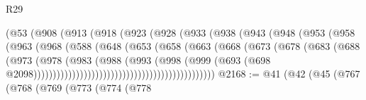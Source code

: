 \begin{lexlean}{R29}
\begin{coremodule}
                                (@53
                                  (@908
                                    (@913
                                      (@918
                                        (@923
                                          (@928
                                            (@933
                                              (@938
                                                (@943
                                                  (@948
                                                    (@953
                                                      (@958
                                                        (@963
                                                          (@968
                                                            (@588
                                                              (@648
                                                                (@653
                                                                  (@658
                                                                    (@663
                                                                      (@668
                                                                        (@673
                                                                          (@678
                                                                            (@683
                                                                              (@688
                                                                                (@973
                                                                                  (@978
                                                                                    (@983
                                                                                      (@988
                                                                                        (@993
                                                                                          (@998
                                                                                            (@999
                                                                                              (@693
                                                                                                (@698
                                                                                                  @2098)))))))))))))))))))))))))))))))))))))))))))))))
@2168 := @41
    (@42
      (@45
        (@767
          (@768
            (@769
              (@773
                (@774
                  (@778

\end{coremodule}
\end{lexlean}
